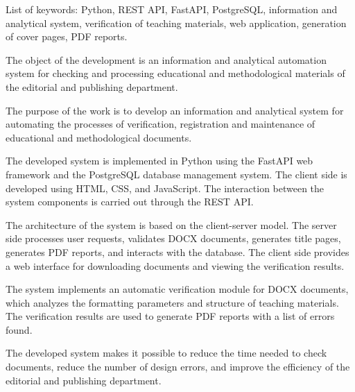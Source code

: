 List of keywords: Python, REST API, FastAPI, PostgreSQL,
information and analytical system, verification of teaching materials, web application, generation of cover pages, PDF reports.

The object of the development is an information and analytical automation system for checking and processing educational and methodological materials of the editorial and publishing department.

The purpose of the work is to develop an information and analytical system for automating the processes of verification, registration and maintenance of educational and methodological documents.

The developed system is implemented in Python using the FastAPI web framework and the PostgreSQL database management system. The client side is developed using HTML, CSS, and JavaScript. The interaction between the system components is carried out through the REST API.

The architecture of the system is based on the client-server model. The server side processes user requests, validates DOCX documents, generates title pages, generates PDF reports, and interacts with the database. The client side provides a web interface for downloading documents and viewing the verification results.

The system implements an automatic verification module for DOCX documents, which analyzes the formatting parameters and structure of teaching materials. The verification results are used to generate PDF reports with a list of errors found.

The developed system makes it possible to reduce the time needed to check documents, reduce the number of design errors, and improve the efficiency of the editorial and publishing department.
	